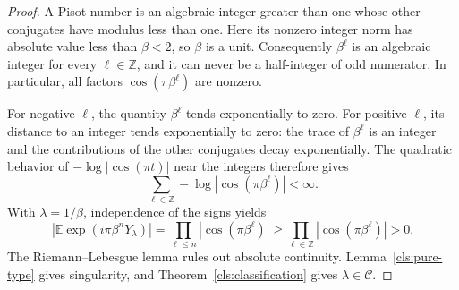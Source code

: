 \begin{proof}
A Pisot number is an algebraic integer greater than one whose other
conjugates have modulus less than one.  Here its nonzero integer norm
has absolute value less than $\beta<2$, so $\beta$ is a unit.
Consequently $\beta^\ell$ is an algebraic integer for every
$\ell\in\mathbb Z$, and it can never be a half-integer of odd
numerator.  In particular, all factors $\cos(\pi\beta^\ell)$ are
nonzero.

For negative $\ell$, the quantity $\beta^\ell$ tends exponentially
to zero.  For positive $\ell$, its distance to an integer tends
exponentially to zero: the trace of $\beta^\ell$ is an integer and
the contributions of the other conjugates decay exponentially.
The quadratic behavior of $-\log|\cos(\pi t)|$ near the integers
therefore gives
\[
  \sum_{\ell\in\mathbb Z}-\log|\cos(\pi\beta^\ell)|<\infty.
\]
With $\lambda=1/\beta$, independence of the signs yields
\[
  \left|\mathbb E\exp(i\pi\beta^nY_\lambda)\right|
     =\prod_{\ell\leq n}|\cos(\pi\beta^\ell)|
     \geq\prod_{\ell\in\mathbb Z}|\cos(\pi\beta^\ell)|>0.
\]
The Riemann--Lebesgue lemma rules out absolute continuity.
Lemma~\ref{cls:pure-type} gives singularity, and
Theorem~\ref{cls:classification} gives $\lambda\in\mathcal C$.
\end{proof}
